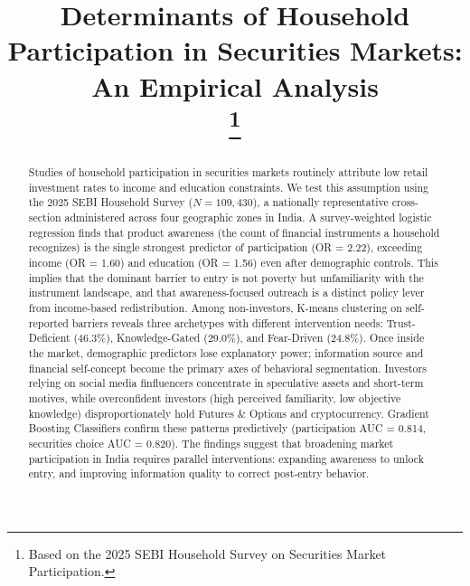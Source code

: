 \documentclass[conference]{IEEEtran}
\begin{document}
\title{Determinants of Household Participation in Securities Markets: An Empirical Analysis\\
\thanks{Based on the 2025 SEBI Household Survey on Securities Market Participation.}
}

\author{
\and
{}
}

\maketitle

\thispagestyle{empty} %


\begin{abstract}
Studies of household participation in securities markets routinely attribute low retail investment rates to income and education constraints. We test this assumption using the 2025 SEBI Household Survey ($N = 109,430$), a nationally representative cross-section administered across four geographic zones in India. A survey-weighted logistic regression finds that product awareness (the count of financial instruments a household recognizes) is the single strongest predictor of participation (OR = 2.22), exceeding income (OR = 1.60) and education (OR = 1.56) even after demographic controls. This implies that the dominant barrier to entry is not poverty but unfamiliarity with the instrument landscape, and that awareness-focused outreach is a distinct policy lever from income-based redistribution. Among non-investors, K-means clustering on self-reported barriers reveals three archetypes with different intervention needs: Trust-Deficient (46.3\%), Knowledge-Gated (29.0\%), and Fear-Driven (24.8\%). Once inside the market, demographic predictors lose explanatory power; information source and financial self-concept become the primary axes of behavioral segmentation. Investors relying on social media finfluencers concentrate in speculative assets and short-term motives, while overconfident investors (high perceived familiarity, low objective knowledge) disproportionately hold Futures \& Options and cryptocurrency. Gradient Boosting Classifiers confirm these patterns predictively (participation AUC = 0.814, securities choice AUC = 0.820). The findings suggest that broadening market participation in India requires parallel interventions: expanding awareness to unlock entry, and improving information quality to correct post-entry behavior.
\end{abstract}
\end{document}
